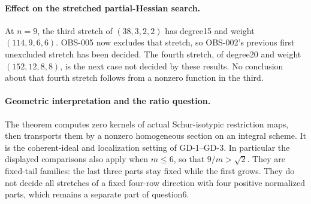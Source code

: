 \paragraph{Effect on the stretched partial-Hessian search.}
At $n=9$, the third stretch of $(38,3,2,2)$ has degree15 and weight
$(114,9,6,6)$. OBS-005 now excludes that stretch, so OBS-002's
previous first unexcluded stretch has been decided. The fourth
stretch, of degree20 and weight $(152,12,8,8)$, is the next case
not decided by these results. No conclusion about that fourth
stretch follows from a nonzero function in the third.

\paragraph{Geometric interpretation and the ratio question.}
The theorem computes zero kernels of actual Schur-isotypic restriction
maps, then transports them by a nonzero homogeneous section on an
integral scheme. It is the coherent-ideal and localization setting
of GD-1--GD-3. In particular the displayed comparisons also apply
when $m\le6$, so that $9/m>\sqrt2$. They are fixed-tail families:
the last three parts stay fixed while the first grows. They do not
decide all stretches of a fixed four-row direction with four positive
normalized parts, which remains a separate part of question6.
